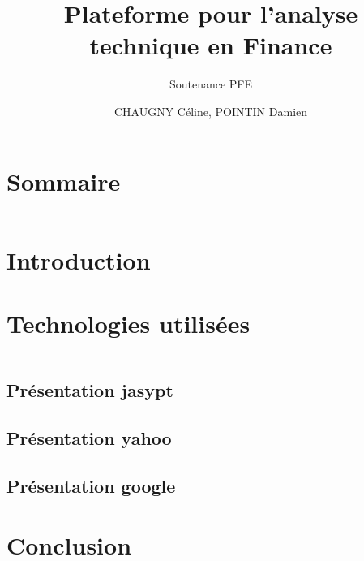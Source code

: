 \documentclass{beamer}
\title{Plateforme pour l'analyse technique en Finance}
\subtitle{Soutenance PFE}
\author{CHAUGNY Céline, POINTIN Damien}
\institute{Génie Mathématique | INSA Rouen}
\begin{document}
    \beamertemplatenavigationsymbolsempty

    \begin{frame}
        \titlepage{}
    \end{frame}

    \section*{Sommaire}
        \begin{frame}
            \begin{columns}[t]
  				\begin{column}{5cm}
  					\tableofcontents[sections={1-4}]
  				\end{column}
  				\begin{column}{5cm}
  					\tableofcontents[sections={5-8}]
  				\end{column}
  			\end{columns}
        \end{frame}

    \section{Introduction}
        \subsection{ }
            

    \section{Technologies utilisées}
        \begin{frame}
            \begin{columns}[t]
  				\begin{column}{5cm}
  					\tableofcontents[sections={1-4}, currentsection]
  				\end{column}
  				\begin{column}{5cm}
  					\tableofcontents[sections={5-8}, currentsection]
  				\end{column}
  			\end{columns}
        \end{frame}
        \subsection{Présentation jasypt}
	        
	    \subsection{Présentation yahoo}
	        
	    \subsection{Présentation google}
	               
        	
    
    
        	
    \section{Conclusion}
        \subsection{}
            
\end{document}
